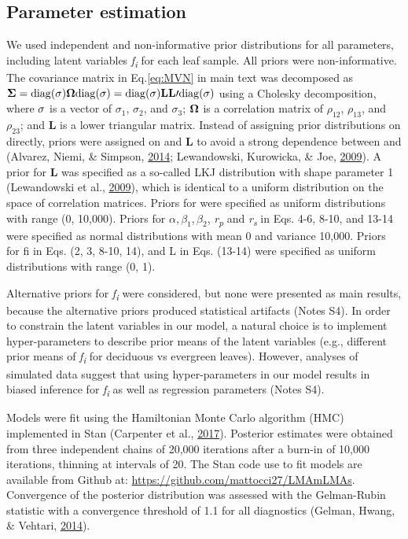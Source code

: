 \documentclass[12pt,]{article}
\theoremstyle{definition}
\theoremstyle{definition}
\theoremstyle{definition}
\theoremstyle{remark}
\begin{document}
\hypertarget{parameter-estimation}{%
\subsection{Parameter estimation}\label{parameter-estimation}}

We used independent and non-informative prior distributions for all
parameters, including latent variables \emph{f\textsubscript{i}} for
each leaf sample. All priors were non-informative. The covariance matrix
in Eq.\eqref{eq:MVN} in main text was decomposed as
\({\bf \Sigma} = {\rm diag}({\bf \sigma}){\bf \Omega}{\rm diag}({\bf \sigma}) = {\rm diag}({\bf \sigma}){\bf LL}\prime {\rm diag}({\bf \sigma})\)
using a Cholesky decomposition, where \({\bf \sigma}\) is a vector of
\(\sigma_{1}\), \(\sigma_{2}\), and \(\sigma_{3}\); \({\bf \Omega}\) is
a correlation matrix of \(\rho_{12}\), \(\rho_{13}\), and \(\rho_{23}\);
and \textbf{L} is a lower triangular matrix. Instead of assigning prior
distributions on directly, priors were assigned on and \textbf{L} to
avoid a strong dependence between and (Alvarez, Niemi, \& Simpson,
\protect\hyperlink{ref-Alvarez2014}{2014}; Lewandowski, Kurowicka, \&
Joe, \protect\hyperlink{ref-Lewandowski2009}{2009}). A prior for
\textbf{L} was specified as a so-called LKJ distribution with shape
parameter 1 (Lewandowski et al.,
\protect\hyperlink{ref-Lewandowski2009}{2009}), which is identical to a
uniform distribution on the space of correlation matrices. Priors for
were specified as uniform distributions with range (0, 10,000). Priors
for \(\alpha, \beta_{1}, \beta_{2}\), \emph{r\textsubscript{p}} and
\emph{r\textsubscript{s}} in Eqs. 4-6, 8-10, and 13-14 were specified as
normal distributions with mean 0 and variance 10,000. Priors for fi in
Eqs. (2, 3, 8-10, 14), and L in Eqs. (13-14) were specified as uniform
distributions with range (0, 1).

Alternative priors for \emph{f\textsubscript{i}} were considered, but
none were presented as main results, because the alternative priors
produced statistical artifacts (Notes S4). In order to constrain the
latent variables in our model, a natural choice is to implement
hyper-parameters to describe prior means of the latent variables (e.g.,
different prior means of \emph{f\textsubscript{i}} for deciduous vs
evergreen leaves). However, analyses of simulated data suggest that
using hyper-parameters in our model results in biased inference for
\emph{f\textsubscript{i}} as well as regression parameters (Notes S4).

Models were fit using the Hamiltonian Monte Carlo algorithm (HMC)
implemented in Stan (Carpenter et al.,
\protect\hyperlink{ref-Carpenter2017}{2017}). Posterior estimates were
obtained from three independent chains of 20,000 iterations after a
burn-in of 10,000 iterations, thinning at intervals of 20. The Stan code
use to fit models are available from Github at:
\url{https://github.com/mattocci27/LMAmLMAs}. Convergence of the
posterior distribution was assessed with the Gelman-Rubin statistic with
a convergence threshold of 1.1 for all diagnostics (Gelman, Hwang, \&
Vehtari, \protect\hyperlink{ref-Gelman2014}{2014}).
\end{document}
